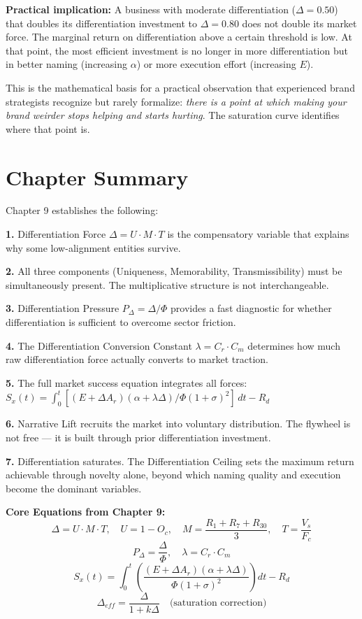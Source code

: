 \documentclass[12pt, openany]{book}
\theoremstyle{thmstyle}
\theoremstyle{defstyle}
\begin{document}
\textbf{Practical implication:} A business with moderate differentiation ($\Delta = 0.50$) that doubles its differentiation investment to $\Delta = 0.80$ does not double its market force. The marginal return on differentiation above a certain threshold is low. At that point, the most efficient investment is no longer in more differentiation but in better naming (increasing $\alpha$) or more execution effort (increasing $E$).

This is the mathematical basis for a practical observation that experienced brand strategists recognize but rarely formalize: \textit{there is a point at which making your brand weirder stops helping and starts hurting}. The saturation curve identifies where that point is.

\section{Chapter Summary}

Chapter 9 establishes the following:

\textbf{1.} Differentiation Force $\Delta = U \cdot M \cdot T$ is the compensatory variable that explains why some low-alignment entities survive.

\textbf{2.} All three components (Uniqueness, Memorability, Transmissibility) must be simultaneously present. The multiplicative structure is not interchangeable.

\textbf{3.} Differentiation Pressure $P_\Delta = \Delta/\Phi$ provides a fast diagnostic for whether differentiation is sufficient to overcome sector friction.

\textbf{4.} The Differentiation Conversion Constant $\lambda = C_r \cdot C_m$ determines how much raw differentiation force actually converts to market traction.

\textbf{5.} The full market success equation integrates all forces:
$S_x(t) = \int_0^t [(E + \Delta A_r)(\alpha + \lambda\Delta) / \Phi(1+\sigma)^2]\, dt - R_d$

\textbf{6.} Narrative Lift recruits the market into voluntary distribution. The flywheel is not free --- it is built through prior differentiation investment.

\textbf{7.} Differentiation saturates. The Differentiation Ceiling sets the maximum return achievable through novelty alone, beyond which naming quality and execution become the dominant variables.

\begin{equationbox}
\textbf{Core Equations from Chapter 9:}
\[
\Delta = U \cdot M \cdot T, \quad U = 1 - O_c, \quad M = \frac{R_1+R_7+R_{30}}{3}, \quad T = \frac{V_s}{F_c}
\]
\[
P_\Delta = \frac{\Delta}{\Phi}, \quad \lambda = C_r \cdot C_m
\]
\[
S_x(t) = \int_0^t \left(\frac{(E + \Delta A_r)(\alpha + \lambda\Delta)}{\Phi(1+\sigma)^2}\right) dt - R_d
\]
\[
\Delta_{eff} = \frac{\Delta}{1 + k\Delta} \quad \text{(saturation correction)}
\]
\end{equationbox}
\end{document}
